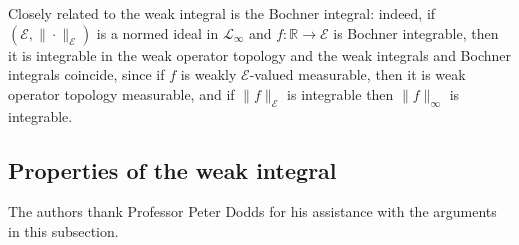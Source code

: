     Closely related to the weak integral is the Bochner integral: indeed, if $(\mathcal{E},\|\cdot\|_{\mathcal{E}})$ is a normed ideal in $\mathcal{L}_\infty$
    and $f:\mathbb{R}\to \mathcal{E}$ is Bochner integrable, then it is integrable in the weak operator topology and the weak integrals
    and Bochner integrals coincide, since if $f$ is weakly $\mathcal{E}$-valued measurable, then it is weak operator topology measurable, and if $\|f\|_{\mathcal{E}}$
    is integrable then $\|f\|_\infty$ is integrable.
    
\subsection{Properties of the weak integral}\label{peter subsection}

    The authors thank Professor Peter Dodds for his assistance with the arguments in this subsection.

